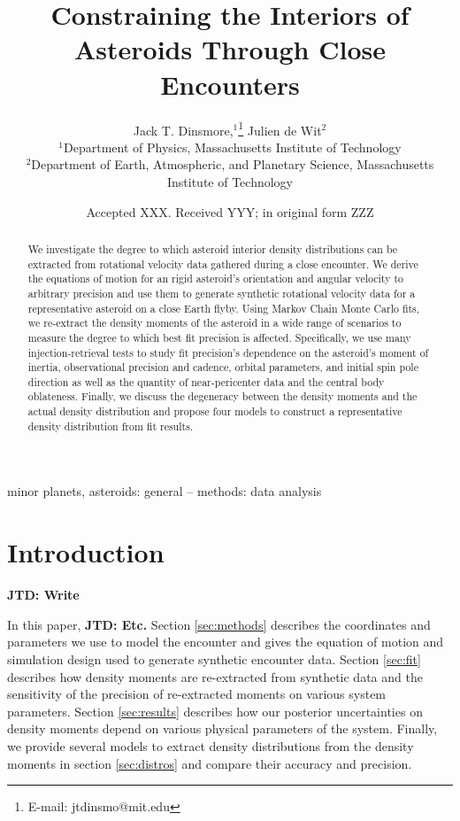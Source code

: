\documentclass[fleqn,usenatbib]{mnras}
\title[Flyby Constraints on Asteroids Interiors]{Constraining the Interiors of Asteroids Through Close Encounters}
\author[Jack T. Dinsmore]{
Jack T. Dinsmore,$^{1}$\thanks{E-mail: jtdinsmo@mit.edu}
Julien de Wit$^{2}$
\\
$^{1}$Department of Physics, Massachusetts Institute of Technology\\
$^{2}$Department of Earth, Atmospheric, and Planetary Science, Massachusetts Institute of Technology
}
\date{Accepted XXX. Received YYY; in original form ZZZ}
\newcommand{\jtd}[1]{ {\bf{\color{red} JTD: #1}} }
\begin{document}
\label{firstpage}
\pagerange{\pageref{firstpage}--\pageref{lastpage}}
\maketitle

\begin{abstract}
  We investigate the degree to which asteroid interior density distributions can be extracted from rotational velocity data gathered during a close encounter. We derive the equations of motion for an rigid asteroid's orientation and angular velocity to arbitrary precision and use them to generate synthetic rotational velocity data for a representative asteroid on a close Earth flyby. Using Markov Chain Monte Carlo fits, we re-extract the density moments of the asteroid in a wide range of scenarios to measure the degree to which best fit precision is affected. Specifically, we use many injection-retrieval tests to study fit precision's dependence on the asteroid's moment of inertia, observational precision and cadence, orbital parameters, and initial spin pole direction as well as the quantity of near-pericenter data and the central body oblateness. Finally, we discuss the degeneracy between the density moments and the actual density distribution and propose four models to construct a representative density distribution from fit results.
\end{abstract}

\begin{keywords}
  minor planets, asteroids: general -- methods: data analysis
\end{keywords}



\section{Introduction}

\jtd{Write}

In this paper, \jtd{Etc.} Section \ref{sec:methods} describes the coordinates and parameters we use to model the encounter and gives the equation of motion and simulation design used to generate synthetic encounter data. Section \ref{sec:fit} describes how density moments are re-extracted from synthetic data and the sensitivity of the precision of re-extracted moments on various system parameters. Section \ref{sec:results} describes how our posterior uncertainties on density moments depend on various physical parameters of the system. Finally, we provide several models to extract density distributions from the density moments in section \ref{sec:distros} and compare their accuracy and precision.
\end{document}
